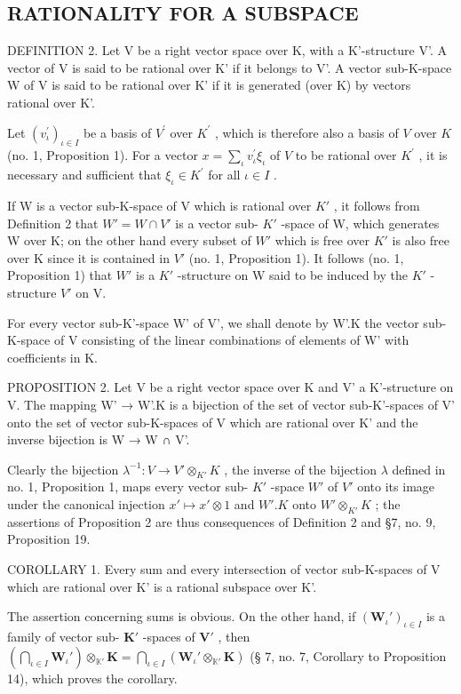 \subsection{RATIONALITY FOR A SUBSPACE}

DEFINITION 2. Let V be a right vector space over K, with a K'-structure V'. A vector of V is said to be rational over K' if it belongs to V'. A vector sub-K-space W of V is said to be rational over K' if it is generated (over K) by vectors rational over K'.

Let \((v_{\iota}^{\prime})_{\iota\in I}\) be a basis of \(V^{\prime}\) over \(K^{\prime}\) , which is therefore also a basis of \(V\) over \(K\) (no. 1, Proposition 1). For a vector \(x = \sum_{\iota} v_{\iota}^{\prime} \xi_{\iota}\) of \(V\) to be rational over \(K^{\prime}\) , it is necessary and sufficient that \(\xi_{\iota} \in K^{\prime}\) for all \(\iota \in I\) .

If W is a vector sub-K-space of V which is rational over \(K'\) , it follows from Definition 2 that \(W' = W \cap V'\) is a vector sub- \(K'\) -space of W, which generates W over K; on the other hand every subset of \(W'\) which is free over \(K'\) is also free over K since it is contained in \(V'\) (no. 1, Proposition 1). It follows (no. 1, Proposition 1) that \(W'\) is a \(K'\) -structure on W said to be induced by the \(K'\) -structure \(V'\) on V.

For every vector sub-K'-space W' of V', we shall denote by W'.K the vector sub-K-space of V consisting of the linear combinations of elements of W' with coefficients in K.

PROPOSITION 2. Let V be a right vector space over K and V' a K'-structure on V. The mapping W' → W'.K is a bijection of the set of vector sub-K'-spaces of V' onto the set of vector sub-K-spaces of V which are rational over K' and the inverse bijection is W → W ∩ V'.

Clearly the bijection \(\lambda^{-1}: V \to V' \otimes_{K'} K\) , the inverse of the bijection \(\lambda\) defined in no. 1, Proposition 1, maps every vector sub- \(K'\) -space \(W'\) of \(V'\) onto its image under the canonical injection \(x' \mapsto x' \otimes 1\) and \(W'. K\) onto \(W' \otimes_{K'} K\) ; the assertions of Proposition 2 are thus consequences of Definition 2 and §7, no. 9, Proposition 19.

COROLLARY 1. Every sum and every intersection of vector sub-K-spaces of V which are rational over K' is a rational subspace over K'.

The assertion concerning sums is obvious. On the other hand, if \((\mathbf{W}_{\iota}')_{\iota \in I}\) is a family of vector sub- \(\mathbf{K}'\) -spaces of \(\mathbf{V}'\) , then \(\left(\bigcap_{\iota \in I} \mathbf{W}_{\iota}'\right) \otimes_{\mathbb{K}'} \mathbf{K} = \bigcap_{\iota \in I} (\mathbf{W}_{\iota}' \otimes_{\mathbb{K}'} \mathbf{K})\) (§ 7, no. 7, Corollary to Proposition 14), which proves the corollary.


